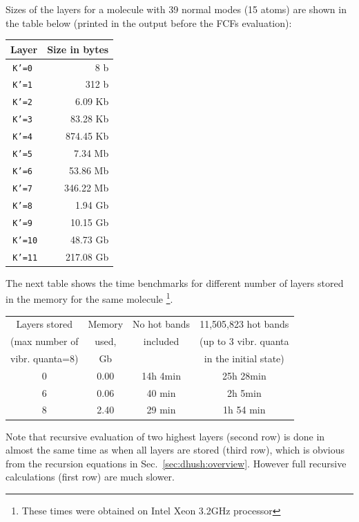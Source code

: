 \documentclass[11pt]{article}
\begin{document}
Sizes of the layers for a molecule with 39 normal modes (15 atoms) are shown in the table below 
(printed in the output before the FCFs evaluation):

\begin{center}
\begin{tabular}{rr}
\hline
 Layer & Size in bytes \\
\hline
  {\tt  K'=0 }  & 8 b \\
  {\tt  K'=1 }  & 312 b \\
  {\tt  K'=2 }  & 6.09 Kb \\
  {\tt  K'=3 }  & 83.28 Kb \\
  {\tt  K'=4 }  & 874.45 Kb \\
  {\tt  K'=5 }  & 7.34 Mb \\
  {\tt  K'=6 }  & 53.86 Mb \\
  {\tt  K'=7 }  & 346.22 Mb \\
  {\tt  K'=8 }  & 1.94 Gb \\ 
  {\tt  K'=9 }  & 10.15 Gb\\
  {\tt  K'=10}  & 48.73 Gb \\
  {\tt  K'=11}  & 217.08 Gb \\
\hline
\end{tabular}
\end{center}

The next table shows the time benchmarks for different number of layers stored in the memory for the same molecule
\footnote{These times were obtained on Intel Xeon 3.2GHz processor}.

\begin{center}
\begin{tabular}{cccc}
\hline
Layers stored    & Memory & No hot bands& 11,505,823 hot bands \\
(max number of   & used,  & included    & (up to 3 vibr. quanta \\
vibr. quanta=8)  & Gb     &             & in the initial state)\\
\hline
0 & 0.00 & 14h 4min & 25h 28min \\
6 & 0.06 & 40 min   & 2h 5min \\
8 & 2.40 & 29 min   & 1h 54 min \\
\hline
\end{tabular}
\end{center}

Note that recursive evaluation of two highest layers (second row) is done in almost the same time 
as when all layers are stored (third row), 
which is obvious from the recursion equations in Sec.~\ref{sec:dhush:overview}.
However full recursive calculations (first row) are much slower.
\end{document}
